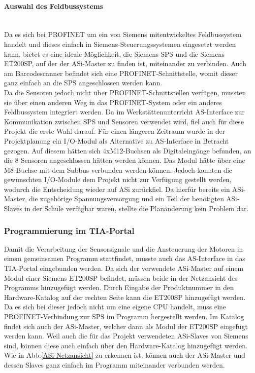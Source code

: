\paragraph{Auswahl des Feldbussystems}\mbox{}\\
Da es sich bei PROFINET um ein von Siemens mitentwickeltes Feldbussystem handelt und dieses einfach in Siemens-Steuerungssystemen eingesetzt werden kann, bietet es eine ideale Möglichkeit, die Siemens SPS und die Siemens ET200SP, auf der der ASi-Master zu finden ist, miteinander zu verbinden. Auch am Barcodescanner befindet sich eine PROFINET-Schnittstelle, womit dieser ganz einfach an die SPS angeschlossen werden kann.\\
Da die Sensoren jedoch nicht über PROFINET-Schnittstellen verfügen, mussten sie über einen anderen Weg in das PROFINET-System oder ein anderes Feldbussystem integriert werden. Da im Werkstättenunterricht AS-Interface zur Kommunikation zwischen SPS und Sensoren verwendet wird, fiel auch für diese Projekt die erste Wahl darauf. Für einen längeren Zeitraum wurde in der Projektplanung ein I/O-Modul als Alternative zu AS-Interface in Betracht gezogen. Auf diesem hätten sich 4xM12-Buchsen als Digitaleingänge befunden, an die 8 Sensoren angeschlossen hätten werden können. Das Modul hätte über eine M8-Buchse mit dem Subbus verbunden werden können. Jedoch konnten die gewünschten I/O-Module dem Projekt nicht zur Verfügung gestellt werden, wodurch die Entscheidung wieder auf ASi zurückfiel. Da hierfür bereits ein ASi-Master, die zugehörige Spannungsversorgung und ein Teil der benötigten ASi-Slaves in der Schule verfügbar waren, stellte die Planänderung kein Problem dar.

\subsubsection{Programmierung im TIA-Portal}
Damit die Verarbeitung der Sensorsignale und die Ansteuerung der Motoren in einem gemeinsamen Programm stattfindet, musste auch das AS-Interface in das TIA-Portal eingebunden werden. Da sich der verwendete ASi-Master auf einem Modul einer Siemens ET200SP befindet, müssen beide in der Netzansicht des Programms hinzugefügt werden. Durch Eingabe der Produktnummer in den Hardware-Katalog auf der rechten Seite kann die ET200SP hinzugefügt werden. Da es sich bei dieser jedoch nicht um eine eigene CPU handelt, muss eine PROFINET-Verbindung zur SPS im Programm hergestellt werden. Im Katalog findet sich auch der ASi-Master, welcher dann als Modul der ET200SP eingefügt werden kann. Weil auch die für das Projekt verwendeten ASi-Slaves von Siemens sind, können diese auch einfach über den Hardware-Katalog hinzugefügt werden. Wie in Abb.\ref{ASi-Netzansicht} zu erkennen ist, können auch der ASi-Master und dessen Slaves ganz einfach im Programm miteinander verbunden werden.

